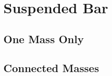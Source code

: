 \documentclass{article}
\begin{document}
\section{Suspended Bar}

\subsection{One Mass Only}

\subsubsection{} %



\subsubsection{} %



\subsubsection{} %



\subsubsection{} %



\subsubsection{} %



\subsubsection{} %



\subsubsection{} %


\subsection{Connected Masses}

\subsubsection{} %



\subsubsection{} %



\subsubsection{} %



\subsubsection{} %
\end{document}
